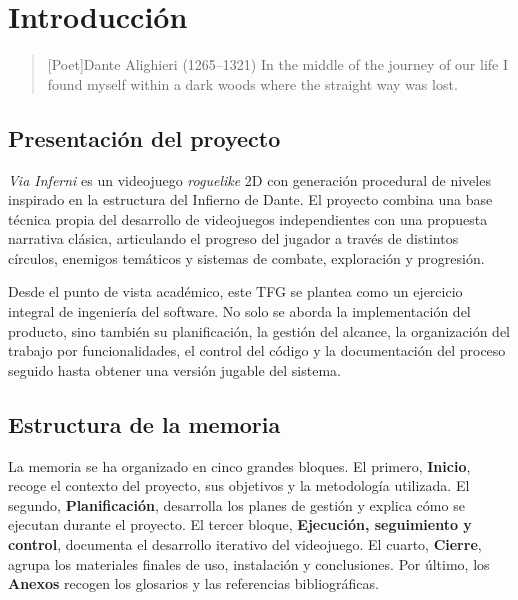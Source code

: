 \chapter{Introducción}

\begin{quotation}[Poet]{Dante Alighieri (1265--1321)}
In the middle of the journey of our life I found myself within a dark woods where the straight way was lost.
\end{quotation}

\begin{abstract}
Este capítulo presenta una visión general de \textit{Via Inferni} y sitúa el proyecto
dentro del marco de un Trabajo de Fin de Grado de Ingeniería del Software. Se resume
la propuesta del videojuego, el problema que aborda y la forma en la que se estructura
la memoria.
\end{abstract}

\section{Presentación del proyecto}
\textit{Via Inferni} es un videojuego \textit{roguelike} 2D con generación procedural
de niveles inspirado en la estructura del Infierno de Dante. El proyecto combina una
base técnica propia del desarrollo de videojuegos independientes con una propuesta
narrativa clásica, articulando el progreso del jugador a través de distintos círculos,
enemigos temáticos y sistemas de combate, exploración y progresión.

Desde el punto de vista académico, este TFG se plantea como un ejercicio integral de
ingeniería del software. No solo se aborda la implementación del producto, sino también
su planificación, la gestión del alcance, la organización del trabajo por funcionalidades,
el control del código y la documentación del proceso seguido hasta obtener una versión
jugable del sistema.

\section{Estructura de la memoria}
La memoria se ha organizado en cinco grandes bloques. El primero, \textbf{Inicio},
recoge el contexto del proyecto, sus objetivos y la metodología utilizada. El segundo,
\textbf{Planificación}, desarrolla los planes de gestión y explica cómo se ejecutan
durante el proyecto. El tercer bloque, \textbf{Ejecución, seguimiento y control},
documenta el desarrollo iterativo del videojuego. El cuarto, \textbf{Cierre}, agrupa
los materiales finales de uso, instalación y conclusiones. Por último, los
\textbf{Anexos} recogen los glosarios y las referencias bibliográficas.
